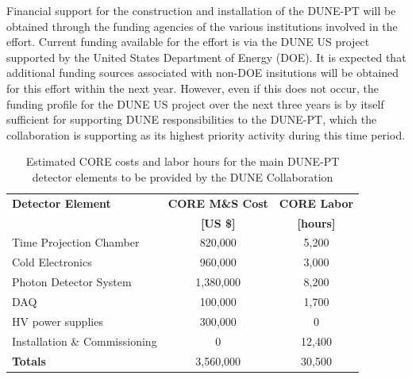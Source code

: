 Financial support for the construction and installation of the DUNE-PT will be obtained through the 
funding agencies of the various institutions involved in the effort.  Current funding available for 
the effort is via the DUNE US project supported by the United States Department of Energy (DOE).  It 
is expected that additional funding sources associated with non-DOE insitutions will be obtained for 
this effort within the next year.  However, even if this does not occur, the funding profile for the 
DUNE US project over the next three years is by itself sufficient for supporting DUNE responsibilities 
to the DUNE-PT, which the collaboration is supporting as its highest priority activity during this 
time period.      
  

\begin{table}[h!]
\centering
\begin{tabular}{| l| c| c |}
\hline
\textbf{Detector Element} & \textbf{CORE M\&S Cost }  & \textbf{CORE Labor}  \\
 & \textbf{ [US \$]}  & \textbf{ [hours]}  \\ \hline
Time Projection Chamber & 820,000 & 5,200 \\
Cold Electronics & 960,000 & 3,000 \\
Photon Detector System & 1,380,000 & 8,200 \\
DAQ & 100,000 & 1,700 \\
HV power supplies & 300,000 & 0 \\
Installation \& Commissioning & 0 & 12,400 \\ \hline
\textbf{Totals} & 3,560,000 & 30,500 \\ \hline
\end{tabular}
\caption{Estimated CORE costs and labor hours for the main DUNE-PT detector elements to be provided 
by the DUNE Collaboration}
\label{tab:cost}
\end{table}




